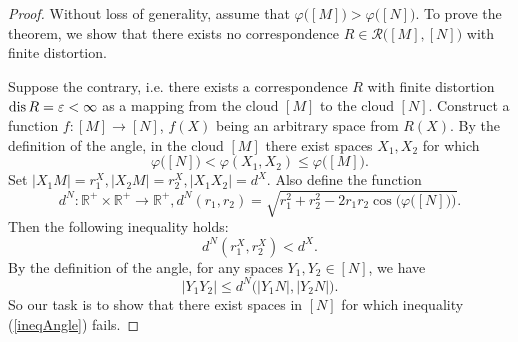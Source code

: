 \documentclass[leqno]{article}
\begin{document}
\begin{proof}
    Without loss of generality, assume that \( \varphi \big([M]\big)>
    \varphi \big([N]\big) \). To prove the theorem, we show that there
    exists no correspondence \( R\in \mathcal{R}\big([M],[N]\big) \) with
    finite distortion.

    Suppose the contrary, i.e. there exists a correspondence \( R \) with
    finite distortion \( \operatorname{dis} R = \varepsilon < \infty \) as a
    mapping from the cloud \( [M] \) to the cloud \( [N] \).
    Construct a function
    \( f \colon [M] \rightarrow [N] \), \( f(X) \) being an arbitrary
    space from \(
        R(X)
    \). By the definition of the angle, in the cloud \( [M] \) there
    exist spaces \(
    X_1, X_2 \) for which
    \[
        \varphi \big([N]\big) < \varphi (X_1, X_2) \le \varphi
    \big([M]\big). \]
    Set \( |X_1 M| = r_1^X,  |X_2 M| = r_2^X, | X_1 X_2 | = d^X\).
    Also define the function
    \[ d^N \colon \mathbb{R}^+ \times \mathbb{R}^+ \rightarrow
        \mathbb{R}^+, d^N(r_1, r_2) =
        \sqrt{r_1^2 + r_2^2 - 2r_1r_2\cos\Big(\varphi \big([N]\big)\Big)}.
    \]
    Then the following inequality holds:
    \begin{equation}
        d^N(r_1^X, r_2^X) < d^X.
        \label{ineqdx}
    \end{equation}
    By the definition of the angle, for any spaces \( Y_1, Y_2 \in [N] \),
    we have
    \begin{equation}
        | Y_1 Y_2 | \le d^N\big(| Y_1N |, | Y_2N |\big). \label{ineqAngle}
    \end{equation}
    So our task is to show that there exist spaces in \( [N]
    \) for which inequality (\ref{ineqAngle}) fails.


\end{proof}
\end{document}
